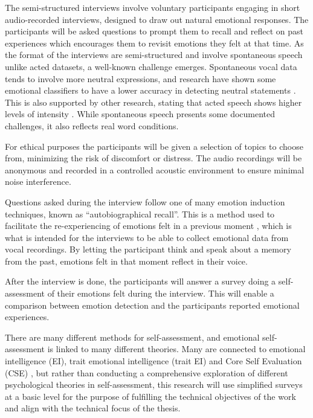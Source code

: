 The semi-structured interviews involve voluntary participants engaging in short audio-recorded interviews, designed to draw out natural emotional responses. The participants will be asked questions to prompt them to recall and reflect on past experiences which encourages them to revisit emotions they felt at that time. 
As the format of the interviews are semi-structured and involve spontaneous speech unlike acted datasets, a well-known challenge emerges. Spontaneous vocal data tends to involve more neutral expressions, and research have shown some emotional classifiers to have a lower accuracy in detecting neutral statements \autocite{Cao2015}. This is also supported by other research, stating that acted speech shows higher levels of intensity \autocite{Chakraborty2016}. While spontaneous speech presents some documented challenges, it also reflects real word conditions.

For ethical purposes the participants will be given a selection of topics to choose from, minimizing the risk of discomfort or distress. The audio recordings will be anonymous and recorded in a controlled acoustic environment to ensure minimal noise interference.

Questions asked during the interview follow one of many emotion induction techniques, known as “autobiographical recall”. This is a method used to facilitate the re-experiencing of emotions felt in a previous moment \autocite{Siedlecka2019}, which is what is intended for the interviews to be able to collect emotional data from vocal recordings. By letting the participant think and speak about a memory from the past, emotions felt in that moment reflect in their voice.

After the interview is done, the participants will answer a survey doing a self-assessment of their emotions felt during the interview. This will enable a comparison between emotion detection and the participants reported emotional experiences.

There are many different methods for self-assessment, and emotional self-assessment is linked to many different theories. Many are connected to emotional intelligence (EI), trait emotional intelligence (trait EI) and Core Self Evaluation (CSE) \autocite{Montasem2013}, but rather than conducting a comprehensive exploration of different psychological theories in self-assessment, this research will use simplified surveys at a basic level for the purpose of fulfilling the technical objectives of the work and align with the technical focus of the thesis.

